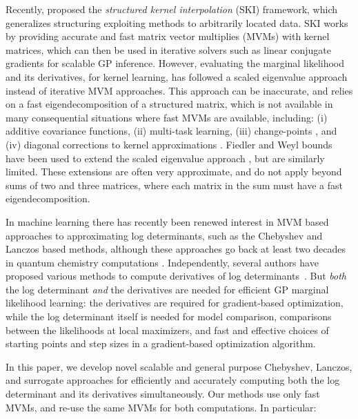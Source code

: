 Recently, \citet{wilson2015kernel} proposed the {\em structured kernel
interpolation} (SKI) framework, which generalizes structuring exploiting methods
to arbitrarily located data.  SKI works by providing accurate and fast matrix
vector multiplies (MVMs) with kernel matrices, which can then be used in
iterative solvers such as linear conjugate gradients for scalable GP inference. 
However, evaluating the marginal likelihood and its derivatives, for kernel
learning, has followed a scaled eigenvalue approach \citep{wilson2014fast,
wilson2015kernel} instead of iterative MVM approaches.  This approach can be
inaccurate, and relies on a fast eigendecomposition of a structured matrix,
which is not available in many consequential situations where fast MVMs are
available, including: (i) additive covariance functions, (ii) multi-task
learning, (iii) change-points \citep{herlands2016scalable}, and (iv) diagonal
corrections to kernel approximations \citep{snelson2006sparse}.  Fiedler
\citep{fiedler84hankelLoewner} and Weyl \citep{weyl1912} bounds have been used
to extend the scaled eigenvalue approach \citep{flaxman2015fast,
herlands2016scalable}, but are similarly limited.  These extensions are often
very approximate, and do not apply beyond sums of two and three matrices, where
each matrix in the sum must have a fast eigendecomposition.

In machine learning there has recently been renewed interest in MVM based
approaches to approximating log determinants, such as the Chebyshev 
\citep{han2015large} and Lanczos \citep{ubarufast} based methods, although these
approaches go back at least two decades in quantum chemistry computations 
\citep{bai1998computing}. Independently, several authors have proposed various
methods to compute derivatives of log determinants~\citep{mackay1997efficient,
stein2013stochastic}. But {\em both} the log determinant {\em and} the
derivatives are needed for efficient GP marginal likelihood learning: the
derivatives are required for gradient-based optimization, while the log
determinant itself is needed for model comparison, comparisons between the
likelihoods at local maximizers, and fast and effective choices of starting
points and step sizes in a gradient-based optimization algorithm.

In this paper, we develop novel scalable and general purpose Chebyshev, Lanczos,
and surrogate approaches for efficiently and accurately computing both the log
determinant and its derivatives simultaneously. Our methods use only fast MVMs,
and re-use the same MVMs for both computations. In particular:

